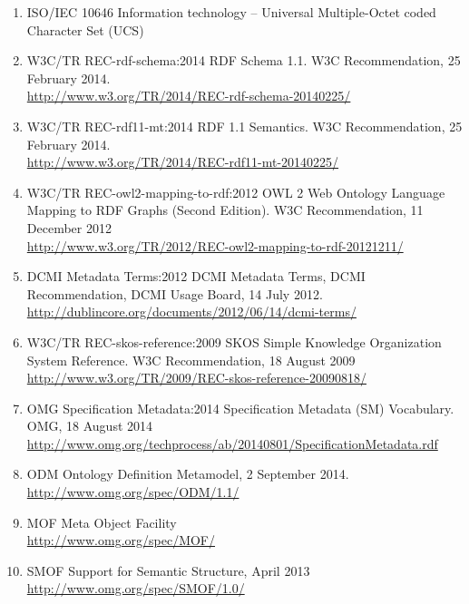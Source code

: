 \documentclass[10pt, a4paper]{isov2}
\begin{document}
\begin{enumerate}[label=\bfseries NR\arabic*]
  \item{ISO/IEC 10646} {Information technology – Universal Multiple-Octet coded Character Set (UCS)}\label{nref-UCS}
  \item{W3C/TR REC-rdf-schema:2014} {RDF Schema 1.1. W3C Recommendation, 25 February 2014.\\ \url{http://www.w3.org/TR/2014/REC-rdf-schema-20140225/}}\label{nref-RDFS}
  \item{W3C/TR REC-rdf11-mt:2014} {RDF 1.1 Semantics.  W3C Recommendation, 25 February 2014. \\ \url{http://www.w3.org/TR/2014/REC-rdf11-mt-20140225/}}\label{nref-RDFSs}
  \item{W3C/TR REC-owl2-mapping-to-rdf:2012} {OWL 2 Web Ontology Language
Mapping to RDF Graphs (Second Edition).  W3C Recommendation, 11 December 2012\\ \url{http://www.w3.org/TR/2012/REC-owl2-mapping-to-rdf-20121211/}}\label{nref-OWL2RDF}
  \item{DCMI Metadata Terms:2012} {DCMI Metadata Terms, DCMI Recommendation, DCMI Usage Board, 14 July 2012.\\
     \url{http://dublincore.org/documents/2012/06/14/dcmi-terms/}}\label{nref-DCMI}
  \item{W3C/TR REC-skos-reference:2009} {SKOS Simple Knowledge Organization System
Reference.  W3C Recommendation, 18 August 2009\\ \url{http://www.w3.org/TR/2009/REC-skos-reference-20090818/}}\label{nref-SKOS}
  \item{OMG Specification Metadata:2014} {Specification Metadata (SM) Vocabulary.  OMG, 18 August 2014\\
\url{http://www.omg.org/techprocess/ab/20140801/SpecificationMetadata.rdf}}\label{nref-OMG-SM}
  \item{ODM} {Ontology Definition Metamodel, 2 September 2014. \\ \url{http://www.omg.org/spec/ODM/1.1/}}\label{nref-ODM}
\item{MOF} { Meta Object Facility} \\ \url{http://www.omg.org/spec/MOF/}\label{nref-MOF}
\item{SMOF} { Support for Semantic Structure, April 2013} \\ \url{http://www.omg.org/spec/SMOF/1.0/}\label{nref-SMOF}

\end{enumerate}
\end{document}
